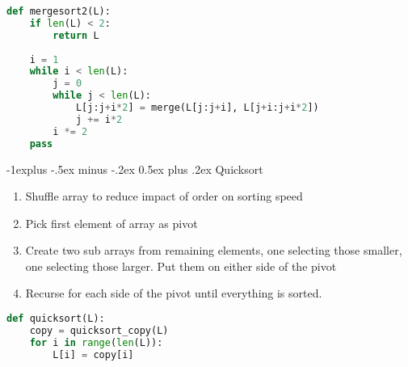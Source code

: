 \documentclass[letterpaper, 8pt]{extarticle}
\makeatletter
\renewcommand{\subsection}{\@startsection{subsection}{2}{0mm}%
                                {-1explus -.5ex minus -.2ex}%
                                {0.5ex plus .2ex}%
                                {\normalfont\small\bfseries}}
\makeatother
\begin{document}
\begin{multicols*}{5}
  \begin{lstlisting}[language=Python]
def mergesort2(L):
    if len(L) < 2:
        return L
    
    i = 1
    while i < len(L):
        j = 0
        while j < len(L):
            L[j:j+i*2] = merge(L[j:j+i], L[j+i:j+i*2])
            j += i*2
        i *= 2
    pass
  \end{lstlisting}


  \subsection{Quicksort}
  \begin{enumerate}
    \item Shuffle array to reduce impact of order on sorting speed
    \item Pick first element of array as pivot
    \item Create two sub arrays from remaining elements, one selecting those smaller,
          one selecting those larger. Put them on either side of the pivot
    \item Recurse for each side of the pivot until everything is sorted.
  \end{enumerate}



\begin{lstlisting}[language=Python, breaklines=true, postbreak=\mbox{\textcolor{red}{$\hookrightarrow$}\space}]
def quicksort(L):
    copy = quicksort_copy(L)
    for i in range(len(L)):
        L[i] = copy[i]



\end{lstlisting}
\end{multicols*}
\end{document}
